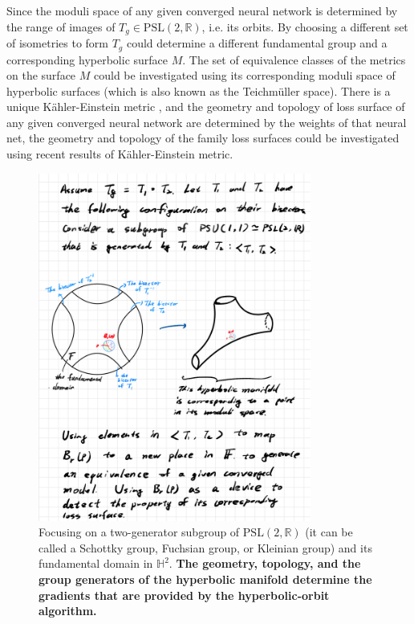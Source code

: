 \documentclass{article}
\theoremstyle{plain}
\theoremstyle{plain} %
\theoremstyle{definition}  %
\theoremstyle{remark}  %
\theoremstyle{plain}
\begin{document}
Since the moduli space of any given converged neural network is determined by the range of images of $T_g\in\text{PSL}(2,\mathbb{R})$, i.e. its orbits. By choosing a different set of isometries to form $T_g$ could determine a different fundamental group and a corresponding hyperbolic surface $M$. The set of equivalence classes of the metrics on the surface $M$ could be investigated using its corresponding moduli space of hyperbolic surfaces (which is also known as the Teichm\"{u}ller space\cite{seppala2011geometry, bers1981finite}). There is a unique K\"{a}hler-Einstein metric \cite{cheng1980existence}, and the geometry and topology of loss surface of any given converged neural network are determined by the weights of that neural net, the geometry and topology of the family loss surfaces could be investigated using recent results of K\"{a}hler-Einstein metric.

\begin{figure}[H]
\centering
\includegraphics[width=0.8\textwidth]{11.png}
\caption{Focusing on a two-generator subgroup of $\text{PSL}(2,\mathbb{R})$ (it can be called a Schottky group, Fuchsian group, or Kleinian group) and its fundamental domain in $\mathbb{H}^2$. \textbf{The geometry, topology, and the group generators of the hyperbolic manifold\cite{thurston2022geometry, seppala2011geometry, gromov1981hyperbolic, thurston1982three, mcmullen1992riemann, benedetti20072+} determine the gradients that are provided by the hyperbolic-orbit algorithm.}}
\end{figure}
\end{document}
